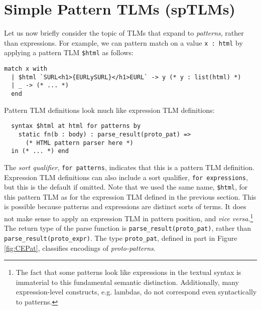\documentclass[acmsmall,10pt,review,anonymous]{acmart}\settopmatter{printfolios=true}
\newcommand{\li}[1]{\lstinline{#1}}
\begin{document}




\newcommand{\spTLMsSec}{Simple Pattern TLMs (spTLMs)}
\section{\protect\spTLMsSec}
\label{sec:sptsms}
Let us now briefly consider the topic of TLMs that expand to \emph{patterns}, rather than expressions. For example, we can pattern match on a value \li{x : html} by applying a pattern TLM \li{$html} as follows:
\begin{lstlisting}[numbers=none]
  match x with 
  | $html `SURL<h1>{EURLySURL}</h1>EURL` -> y (* y : list(html) *)
  | _ -> (* ... *)
  end
\end{lstlisting}

Pattern TLM definitions look much like expression TLM definitions:
\begin{lstlisting}
  syntax $html at html for patterns by 
    static fn(b : body) : parse_result(proto_pat) => 
      (* HTML pattern parser here *)
  in (* ... *) end
\end{lstlisting}
The \emph{sort qualifier}, \li{for patterns}, indicates that this is a pattern TLM definition. Expression TLM definitions can also include a sort qualifier, \li{for expressions}, but this is the default if omitted. 
Note that we used the same name, \li{$html}, for this pattern TLM as for the expression TLM defined in the previous section. This is possible because patterns and expressions are distinct sorts of terms. It does not make sense to apply an expression TLM in pattern position, and \emph{vice versa}.\footnote{The fact that some patterns look like expressions in the textual syntax is immaterial to this fundamental semantic distinction. Additionally, many expression-level constructs, e.g. lambdas, do not correspond even syntactically to patterns.}  
The return type of the parse function is \li{parse_result(proto_pat)}, rather than \li{parse_result(proto_expr)}. The type \li{proto_pat}, defined in part in Figure \ref{fig:CEPat}, classifies encodings of \emph{proto-patterns}.
\end{document}
